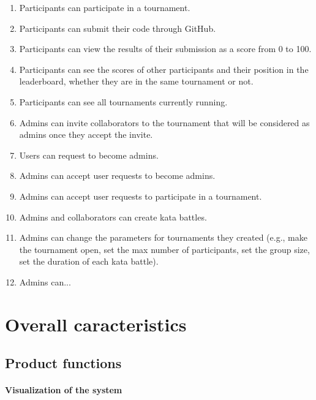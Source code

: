\documentclass{article}
\begin{document}
                
                \begin{enumerate}[label=\textbf{G\arabic*}:]
                    \item Participants can participate in a tournament.
                    \item Participants can submit their code through GitHub.
                    \item Participants can view the results of their submission as a score from 0 to 100.
                    \item Participants can see the scores of other participants and their position in the leaderboard, whether they are in the same tournament or not.
                    \item Participants can see all tournaments currently running.
                    \item Admins can invite collaborators to the tournament that will be considered as admins once they accept the invite.
                    \item Users can request to become admins.
                    \item Admins can accept user requests to become admins.
                    \item Admins can accept user requests to participate in a tournament.
                    \item Admins and collaborators can create kata battles.
                    \item Admins can change the parameters for tournaments they created (e.g., make the tournament open, set the max number of participants, set the group size, set the duration of each kata battle).
                    \item Admins can...
                \end{enumerate}

    \section{Overall caracteristics}
        \subsection{Product functions}
        \paragraph*{Visualization of the system}
\end{document}
